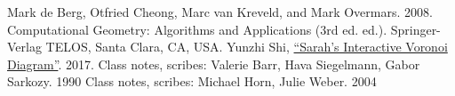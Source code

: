 \documentclass[12pt]{article}
\begin{document}
    \begin{thebibliography}{1}
      Mark de Berg, Otfried Cheong, Marc van Kreveld, and Mark Overmars. 2008. Computational Geometry: Algorithms and Applications (3rd ed. ed.). Springer-Verlag TELOS, Santa Clara, CA, USA.
      Yunzhi Shi, \href{http://yunzhishi.github.io/voronoi.html}{``Sarah's Interactive Voronoi Diagram''}. 2017.
      Class notes, scribes: Valerie Barr, Hava Siegelmann, Gabor Sarkozy. 1990
      Class notes, scribes: Michael Horn, Julie Weber. 2004
    \end{thebibliography}
\end{document}
